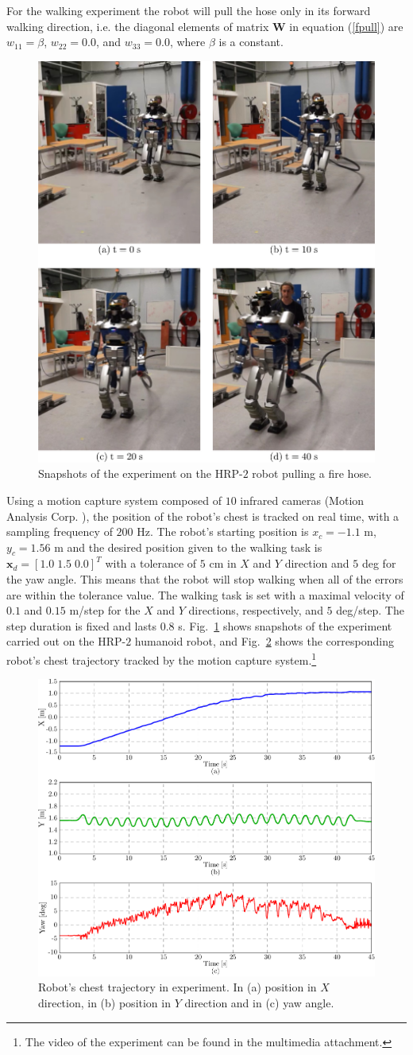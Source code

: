 For the walking experiment the robot will pull the hose only in its forward walking direction, i.e. the diagonal elements of matrix $\mathbf{W}$ in equation (\ref{fpull}) are $w_{11} = \beta$, $w_{22} = 0.0$, and $w_{33}=0.0$, where $\beta$ is a constant.
%
%
\begin{figure}[t]
 \centering
 \includegraphics[height=0.40\textwidth]{./figures/exp_pics.pdf}
 \vspace{-3mm}
 \caption{Snapshots of the experiment on the HRP-$2$ robot pulling a fire hose.}
 \label{exp_pics}
\end{figure}
%
%
Using a motion capture system composed of $10$ infrared cameras (Motion Analysis Corp. \cite{mocap}), the position of the robot's chest is tracked on real time, with a sampling frequency of $200$ Hz.
%
The robot's starting position is $x_c = -1.1$ m, $y_c = 1.56$ m and the desired position given to the walking task is $\mathbf{x}_d = [1.0 \; 1.5 \; 0.0]^T$ with a tolerance of $5$ cm in $X$ and $Y$ direction and $5$ deg for the yaw angle.
%
This means that the robot will stop walking when all of the errors are within the tolerance value.
%
The walking task is set with a maximal velocity of $0.1$ and $0.15$ m/step for the $X$ and $Y$ directions, respectively, and $5$ deg/step.
The step duration is fixed and lasts $0.8$ s.
%
Fig.~\ref{exp_pics} shows snapshots of the experiment carried out on the HRP-$2$ humanoid robot, and Fig.~\ref{exp_graph} shows the corresponding robot's chest trajectory tracked by the motion capture system.\footnote{The video of the experiment can be found in the multimedia attachment.}
%
%
\begin{figure}[t]
 \centering
 \includegraphics[height=0.40\textwidth]{./figures/exp_pos.pdf}
 \vspace{-3mm}
 \caption{Robot's chest trajectory in experiment. In (a) position in $X$ direction, in (b) position in $Y$ direction and in (c) yaw angle.}
 \label{exp_graph}
\end{figure}
